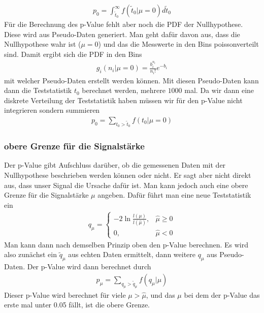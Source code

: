 \begin{gather}
p_{0} = \int_{\tilde{t}_{0}}^{\infty} f(\tilde{t}_{0} | \mu = 0) d\tilde{t}_{0}
\end{gather}
Für die Berechnung des p-Value fehlt aber noch die PDF der Nullhypothese.
Diese wird aus Pseudo-Daten generiert.
Man geht dafür davon aus, dass die Nullhypothese wahr ist ($\mu = 0$) und das die Messwerte in den Bins poissonverteilt sind.
Damit ergibt sich die PDF in den Bins
\begin{gather}
g_{i}(n_{i} | \mu = 0) = \frac{b_{i}^{n_{i}}}{n_{i}!} e^{-b_{i}}
\end{gather}
mit welcher Pseudo-Daten erstellt werden können.
Mit diesen Pseudo-Daten kann dann die Teststatistik $t_{0}$ berechnet werden, mehrere $1000$ mal.
Da wir dann eine diskrete Verteilung der Teststatistik haben müssen wir für den p-Value nicht integrieren sondern summieren
\begin{gather}
p_{0} = \sum_{t_{0} > \tilde{t}_{0}} f(t_{0}|\mu = 0)
\end{gather}

\subsubsection{obere Grenze für die Signalstärke}
Der p-Value gibt Aufschluss darüber, ob die gemessenen Daten mit der Nullhypothese beschrieben werden können oder nicht.
Er sagt aber nicht direkt aus, dass unser Signal die Ursache dafür ist.
Man kann jedoch auch eine obere Grenze für die Signalstärke $\mu$ angeben.
Dafür führt man eine neue Teststatistik ein
\begin{gather}
q_{\mu} =
\begin{cases}
-2 \ln{\frac{l(\mu)}{l(\hat{\mu})}}, & \hat{\mu} \geq 0 \\
0, & \hat{\mu} < 0
\end{cases}
\end{gather}
Man kann dann nach demselben Prinzip oben den p-Value berechnen.
Es wird also zunächst ein $\tilde{q}_{\mu}$ aus echten Daten ermittelt, dann weitere $q_{\mu}$ aus Pseudo-Daten.
Der p-Value wird dann berechnet durch
\begin{gather}
p_{\mu} = \sum_{q_{\mu} > \tilde{q}_{\mu}} f(q_{\mu}|\mu)
\end{gather}
Dieser p-Value wird berechnet für viele $\mu > \hat{\mu}$, und das $\mu$ bei dem der p-Value das erste mal unter \num{0.05} fällt, ist die obere Grenze.

